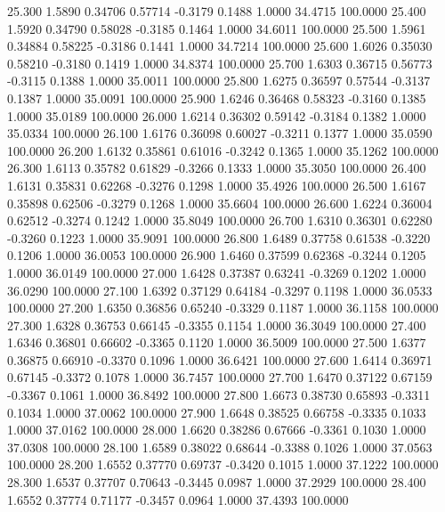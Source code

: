   25.300   1.5890   0.34706   0.57714  -0.3179   0.1488   1.0000  34.4715 100.0000
  25.400   1.5920   0.34790   0.58028  -0.3185   0.1464   1.0000  34.6011 100.0000
  25.500   1.5961   0.34884   0.58225  -0.3186   0.1441   1.0000  34.7214 100.0000
  25.600   1.6026   0.35030   0.58210  -0.3180   0.1419   1.0000  34.8374 100.0000
  25.700   1.6303   0.36715   0.56773  -0.3115   0.1388   1.0000  35.0011 100.0000
  25.800   1.6275   0.36597   0.57544  -0.3137   0.1387   1.0000  35.0091 100.0000
  25.900   1.6246   0.36468   0.58323  -0.3160   0.1385   1.0000  35.0189 100.0000
  26.000   1.6214   0.36302   0.59142  -0.3184   0.1382   1.0000  35.0334 100.0000
  26.100   1.6176   0.36098   0.60027  -0.3211   0.1377   1.0000  35.0590 100.0000
  26.200   1.6132   0.35861   0.61016  -0.3242   0.1365   1.0000  35.1262 100.0000
  26.300   1.6113   0.35782   0.61829  -0.3266   0.1333   1.0000  35.3050 100.0000
  26.400   1.6131   0.35831   0.62268  -0.3276   0.1298   1.0000  35.4926 100.0000
  26.500   1.6167   0.35898   0.62506  -0.3279   0.1268   1.0000  35.6604 100.0000
  26.600   1.6224   0.36004   0.62512  -0.3274   0.1242   1.0000  35.8049 100.0000
  26.700   1.6310   0.36301   0.62280  -0.3260   0.1223   1.0000  35.9091 100.0000
  26.800   1.6489   0.37758   0.61538  -0.3220   0.1206   1.0000  36.0053 100.0000
  26.900   1.6460   0.37599   0.62368  -0.3244   0.1205   1.0000  36.0149 100.0000
  27.000   1.6428   0.37387   0.63241  -0.3269   0.1202   1.0000  36.0290 100.0000
  27.100   1.6392   0.37129   0.64184  -0.3297   0.1198   1.0000  36.0533 100.0000
  27.200   1.6350   0.36856   0.65240  -0.3329   0.1187   1.0000  36.1158 100.0000
  27.300   1.6328   0.36753   0.66145  -0.3355   0.1154   1.0000  36.3049 100.0000
  27.400   1.6346   0.36801   0.66602  -0.3365   0.1120   1.0000  36.5009 100.0000
  27.500   1.6377   0.36875   0.66910  -0.3370   0.1096   1.0000  36.6421 100.0000
  27.600   1.6414   0.36971   0.67145  -0.3372   0.1078   1.0000  36.7457 100.0000
  27.700   1.6470   0.37122   0.67159  -0.3367   0.1061   1.0000  36.8492 100.0000
  27.800   1.6673   0.38730   0.65893  -0.3311   0.1034   1.0000  37.0062 100.0000
  27.900   1.6648   0.38525   0.66758  -0.3335   0.1033   1.0000  37.0162 100.0000
  28.000   1.6620   0.38286   0.67666  -0.3361   0.1030   1.0000  37.0308 100.0000
  28.100   1.6589   0.38022   0.68644  -0.3388   0.1026   1.0000  37.0563 100.0000
  28.200   1.6552   0.37770   0.69737  -0.3420   0.1015   1.0000  37.1222 100.0000
  28.300   1.6537   0.37707   0.70643  -0.3445   0.0987   1.0000  37.2929 100.0000
  28.400   1.6552   0.37774   0.71177  -0.3457   0.0964   1.0000  37.4393 100.0000
